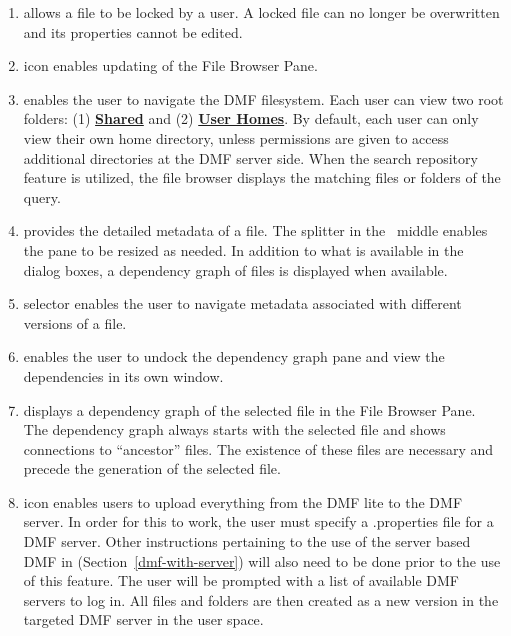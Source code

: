 {\begin{enumerate}
  a zip file of the folder and its contents are created when using the DMF Browser. When using the DMF Browser lite,
  a zip file is not created and the folder is simply created in the intended directory.
\item {} allows a file to be locked by a user. A locked file can no longer be overwritten and its properties cannot be edited.
\item {} icon enables updating of the File Browser Pane.
\item {} enables the user to navigate the DMF filesystem.
  Each user can view two root folders: (1) \textbf{\underline{Shared}} and (2) \textbf{\underline{User Homes}}. By default, each user can only view their
  own home directory, unless permissions are given to access additional directories at the DMF server side.
  When the search repository feature is utilized, the file browser displays the matching files or folders of the query.
\item {} provides the detailed metadata of a file. The splitter in the \
  middle enables the pane to be resized as needed. In addition to what is available in the dialog boxes,
  a dependency graph of files is displayed when available.
\item {} selector enables the user to navigate metadata associated with different versions of a file.
\item \bu{Undock Dependency Graph} enables the user to undock the dependency graph pane and view the dependencies in its own window.
\item \bu{Dependency Graph Pane} displays a dependency graph of the selected file in the File Browser Pane. The dependency graph
  always starts with the selected file and shows connections to ``ancestor'' files. The existence of these files are necessary and
  precede the generation of the selected file.
\item {} icon enables users to upload everything from the DMF lite to the DMF server. In order for this to work,
  the user must specify a .properties file for a DMF server. Other instructions pertaining to the use of the server based DMF in
  (Section~\ref{dmf-with-server}) will also need to be done prior to the use of this feature.
  The user will be prompted with a list of available DMF servers to log in.
  All files and folders are then created as a new version in the targeted DMF server in the user space.
\end{enumerate}

}
